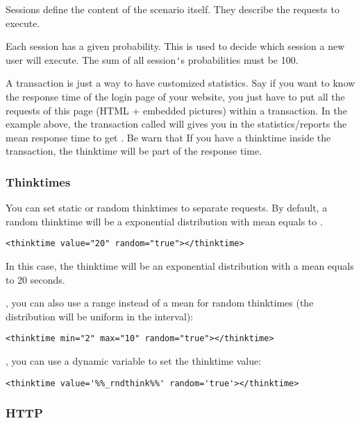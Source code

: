 \documentclass{TSUNG-en}
\begin{document}
Sessions define the content of the scenario itself. They describe
the requests to execute.


Each session has a given probability. This is used to decide which
session a new user will execute. The sum of all session\verb|'|s
probabilities must be 100.



A transaction is just a way to have customized statistics. Say if you
want to know the response time of the login page of your website, you
just have to put all the requests of this page (HTML + embedded
pictures) within a transaction. In the example above, the transaction
called  will gives you in the
statistics/reports the mean response time to get
. Be warn that If you have a
thinktime inside the transaction, the thinktime will be part of the
response time.

\subsubsection{Thinktimes}

You can set static or random thinktimes to separate requests. By
default, a random thinktime will be a exponential distribution with
mean equals to .

\begin{Verbatim}
<thinktime value="20" random="true"></thinktime>
\end{Verbatim}

In this case, the thinktime will be an exponential distribution with a
mean equals to 20 seconds.

, you can also use a range
 instead of a mean for random thinktimes (the
distribution will be uniform in the interval):
\begin{Verbatim}
<thinktime min="2" max="10" random="true"></thinktime>
\end{Verbatim}

, you can use a dynamic variable to set
the thinktime value:
\begin{Verbatim}
<thinktime value='%%_rndthink%%' random='true'></thinktime>
\end{Verbatim}


\subsubsection{HTTP}
\end{document}
